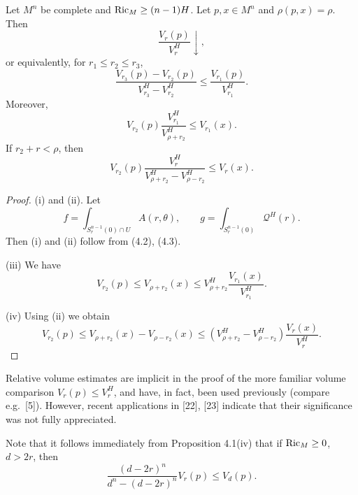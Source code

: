 \begin{proposition}
\label{prop:relative-volume-estimates}
Let $M^n$ be complete and $\operatorname{Ric}_M\geq (n-1)H$. Let $p,x\in M^n$ and
$\rho(p,x)=\rho$. Then
\begin{equation}
\tag{i}
\frac{V_r(p)}{V_r^H}\downarrow,
\end{equation}
or equivalently, for $r_1 \le r_2 \le r_3$,
\begin{equation}
\tag{ii}
\frac{V_{r_3}(p)-V_{r_2}(p)}{V_{r_3}^H-V_{r_2}^H}\le \frac{V_{r_1}(p)}{V_{r_1}^H}.
\end{equation}
Moreover,
\begin{equation}
\tag{iii}
V_{r_2}(p)\frac{V_{r_1}^H}{V_{\rho+r_2}^H}\le V_{r_1}(x).
\end{equation}
If $r_2+r<\rho$, then
\begin{equation}
\tag{iv}
V_{r_2}(p)\frac{V_r^H}{V_{\rho+r_2}^H-V_{\rho-r_2}^H}\le V_r(x).
\end{equation}
\end{proposition}

\begin{proof}
(i) and (ii). Let
\begin{equation}
\tag{4.10}
f=\int_{S_r^{n-1}(0)\cap U}A(r,\theta), \qquad g=\int_{S_r^{n-1}(0)}\mathcal{Q}^H(r).
\end{equation}
Then (i) and (ii) follow from (4.2), (4.3).

(iii) We have
\begin{equation}
\tag{4.11}
V_{r_2}(p)\le V_{\rho+r_2}(x)\le V_{\rho+r_2}^H\frac{V_{r_1}(x)}{V_{r_1}^H}.
\end{equation}

(iv) Using (ii) we obtain
\begin{equation}
\tag{4.12}
V_{r_2}(p)\le V_{\rho+r_2}(x)-V_{\rho-r_2}(x)\le \left(V_{\rho+r_2}^H-V_{\rho-r_2}^H\right)\frac{V_r(x)}{V_r^H}.
\end{equation}
\end{proof}

Relative volume estimates are implicit in the proof of the more familiar volume
comparison $V_r(p)\le V_r^H$, and have, in fact, been used previously (compare
e.g.\ [5]). However, recent applications in [22], [23] indicate that their
significance was not fully appreciated.

Note that it follows immediately from Proposition 4.1(iv) that if
$\operatorname{Ric}_M\ge 0$, $d>2r$, then
\begin{equation}
\tag{4.13}
\frac{(d-2r)^n}{d^n-(d-2r)^n}V_r(p)\le V_d(p).
\end{equation}

